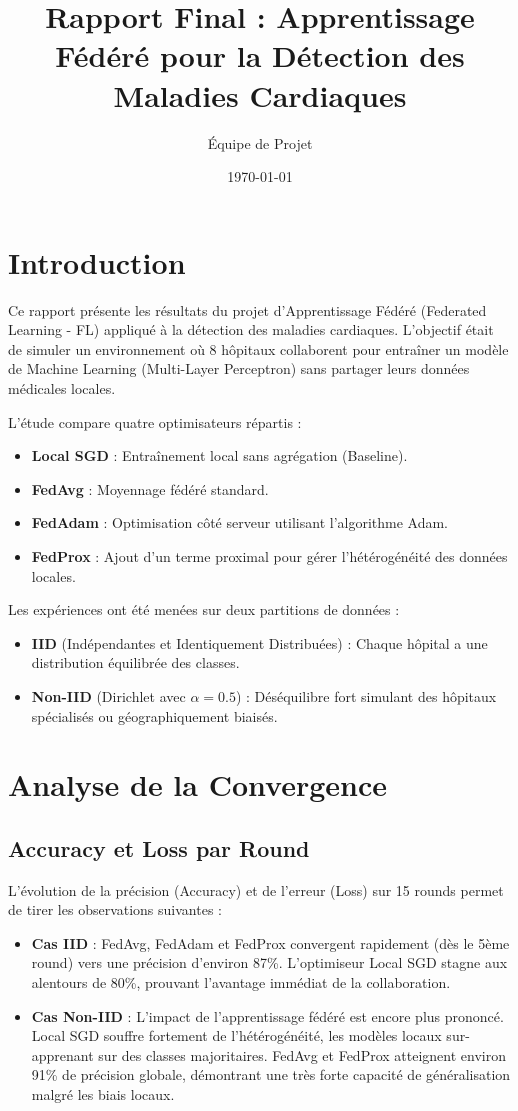 \documentclass[12pt,a4paper]{article}
\title{Rapport Final : Apprentissage Fédéré pour la Détection des Maladies Cardiaques}
\author{Équipe de Projet}
\date{\today}
\begin{document}
\maketitle

\section{Introduction}
Ce rapport présente les résultats du projet d'Apprentissage Fédéré (Federated Learning - FL) appliqué à la détection des maladies cardiaques. L'objectif était de simuler un environnement où 8 hôpitaux collaborent pour entraîner un modèle de Machine Learning (Multi-Layer Perceptron) sans partager leurs données médicales locales.

L'étude compare quatre optimisateurs répartis :
\begin{itemize}
    \item \textbf{Local SGD} : Entraînement local sans agrégation (Baseline).
    \item \textbf{FedAvg} : Moyennage fédéré standard.
    \item \textbf{FedAdam} : Optimisation côté serveur utilisant l'algorithme Adam.
    \item \textbf{FedProx} : Ajout d'un terme proximal pour gérer l'hétérogénéité des données locales.
\end{itemize}

Les expériences ont été menées sur deux partitions de données :
\begin{itemize}
    \item \textbf{IID} (Indépendantes et Identiquement Distribuées) : Chaque hôpital a une distribution équilibrée des classes.
    \item \textbf{Non-IID} (Dirichlet avec $\alpha=0.5$) : Déséquilibre fort simulant des hôpitaux spécialisés ou géographiquement biaisés.
\end{itemize}

\section{Analyse de la Convergence}

\subsection{Accuracy et Loss par Round}
L'évolution de la précision (Accuracy) et de l'erreur (Loss) sur 15 rounds permet de tirer les observations suivantes :
\begin{itemize}
    \item \textbf{Cas IID} : FedAvg, FedAdam et FedProx convergent rapidement (dès le 5ème round) vers une précision d'environ 87\%. L'optimiseur Local SGD stagne aux alentours de 80\%, prouvant l'avantage immédiat de la collaboration.
    \item \textbf{Cas Non-IID} : L'impact de l'apprentissage fédéré est encore plus prononcé. Local SGD souffre fortement de l'hétérogénéité, les modèles locaux sur-apprenant sur des classes majoritaires. FedAvg et FedProx atteignent environ 91\% de précision globale, démontrant une très forte capacité de généralisation malgré les biais locaux.
\end{itemize}
\end{document}
